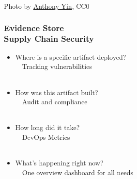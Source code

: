 \documentclass[aspectratio=169,11pt,hyperref={colorlinks=true}]{beamer}
\begin{document}
\begin{textondarkpic}{%
  Photo by \href{https://unsplash.com/@anthonyin}{\underline{Anthony Yin}}, CC0
  }%
  \frametitle{Evidence Store\\Supply Chain Security}
  \begin{itemize}
    \item Where is a specific artifact deployed?\\
          ~~Tracking vulnerabilities\\~
    \item How was this artifact built?\\
          ~~Audit and compliance\\~
    \item How long did it take?\\
          ~~DevOps Metrics\\~
    \item What's happening right now?\\
          ~~One overview dashboard for all needs
  \end{itemize}
\end{textondarkpic}
\end{document}
